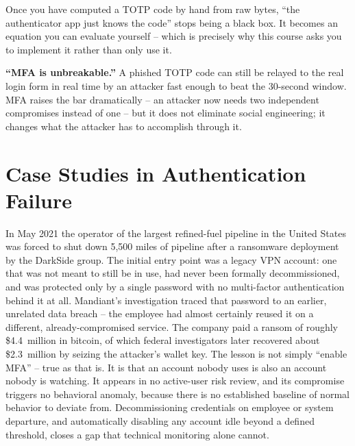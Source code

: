 Once you have computed a TOTP code by hand from raw bytes, ``the authenticator app just knows the
code'' stops being a black box. It becomes an equation you can evaluate yourself -- which is
precisely why this course asks you to implement it rather than only use it.

\begin{misconception}
\textbf{``MFA is unbreakable.''} A phished TOTP code can still be relayed to the real login form
in real time by an attacker fast enough to beat the 30-second window. MFA raises the bar
dramatically -- an attacker now needs two independent compromises instead of one -- but it does
not eliminate social engineering; it changes what the attacker has to accomplish through it.
\end{misconception}

\section{Case Studies in Authentication Failure}

\begin{example}
In May 2021 the operator of the largest refined-fuel pipeline in the United States was forced to
shut down 5,500 miles of pipeline after a ransomware deployment by the DarkSide group. The initial
entry point was a legacy VPN account: one that was not meant to still be in use, had never been
formally decommissioned, and was protected only by a single password with no multi-factor
authentication behind it at all. Mandiant's
investigation traced that password to an earlier, unrelated data breach -- the employee had almost
certainly reused it on a different, already-compromised service. The company paid a ransom of
roughly \$4.4~million in bitcoin, of which federal investigators later recovered about
\$2.3~million by seizing the attacker's wallet key. The lesson is not simply
``enable MFA'' -- true as that is. It is that an account nobody uses is also an account nobody is
watching. It appears in no active-user risk review, and its compromise triggers no behavioral
anomaly, because there is no established baseline of normal behavior to deviate from.
Decommissioning credentials on employee or system departure, and automatically disabling any
account idle beyond a defined threshold, closes a gap that technical monitoring alone cannot.
\end{example}

